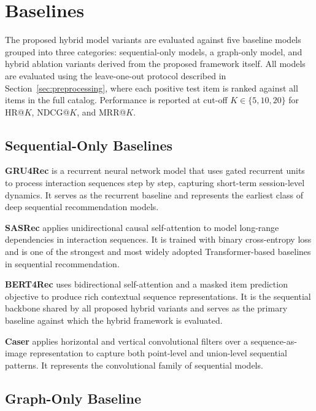\documentclass[12pt,a4paper]{report}
\begin{document}
\section{Baselines}
\label{sec:baselines}

The proposed hybrid model variants are evaluated against five baseline models
grouped into three categories: sequential-only models, a graph-only model, and
hybrid ablation variants derived from the proposed framework itself. All models
are evaluated using the leave-one-out protocol described in
Section~\ref{sec:preprocessing}, where each positive test item is ranked
against all items in the full catalog. Performance is reported at cut-off
\(K \in \{5, 10, 20\}\) for HR@\(K\), NDCG@\(K\), and MRR@\(K\).

\subsection*{Sequential-Only Baselines}

\textbf{GRU4Rec} \citep{hidasi2016gru4rec} is a recurrent neural network model
that uses gated recurrent units to process interaction sequences step by step,
capturing short-term session-level dynamics. It serves as the recurrent
baseline and represents the earliest class of deep sequential recommendation
models.

\textbf{SASRec} \citep{kang2018sasrec} applies unidirectional causal
self-attention to model long-range dependencies in interaction sequences. It is
trained with binary cross-entropy loss and is one of the strongest and most
widely adopted Transformer-based baselines in sequential recommendation.

\textbf{BERT4Rec} \citep{sun2019bert4rec} uses bidirectional self-attention and
a masked item prediction objective to produce rich contextual sequence
representations. It is the sequential backbone shared by all proposed hybrid
variants and serves as the primary baseline against which the hybrid framework
is evaluated.

\textbf{Caser} \citep{tang2018caser} applies horizontal and vertical
convolutional filters over a sequence-as-image representation to capture both
point-level and union-level sequential patterns. It represents the
convolutional family of sequential models.

\subsection*{Graph-Only Baseline}
\end{document}
